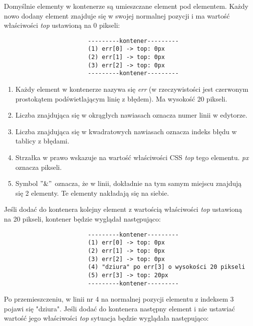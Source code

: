 \documentclass[a4paper,12pt]{book}
\theoremstyle{definition}
\begin{document}
Domyślnie elementy w kontenerze są umieszczane element pod elementem. Każdy nowo dodany element znajduje się w swojej normalnej pozycji i ma wartość właściwości \textit{top} ustawioną na 0 pikseli:

\begin{verbatim}
                        ---------kontener---------
                        (1) err[0] -> top: 0px
                        (2) err[1] -> top: 0px
                        (3) err[2] -> top: 0px
                        ---------kontener---------
\end{verbatim}

\begin{enumerate}
    \item Każdy element w kontenerze nazywa się \textit{err} (w rzeczywistości jest czerwonym prostokątem podświetlającym linię z błędem). Ma wysokość 20 pikseli. 
    \item Liczba znajdująca się w okrągłych nawiasach oznacza numer linii w edytorze.
    \item Liczba znajdująca się w kwadratowych nawiasach oznacza indeks błędu w tablicy z błędami.
    \item Strzałka w prawo wskazuje na wartość właściwości CSS \textit{top} tego elementu. \textit{px} oznacza pikseli.
    \item Symbol $"\&"$ oznacza, że w linii, dokładnie na tym samym miejscu znajdują się 2 elementy. Te elementy nakładają się na siebie.
\end{enumerate}


\noindent Jeśli dodać do kontenera kolejny element z wartością właściwości \textit{top} ustawioną na 20 pikseli, kontener będzie wyglądał następująco:

\begin{verbatim}
                        ---------kontener---------
                        (1) err[0] -> top: 0px
                        (2) err[1] -> top: 0px
                        (3) err[2] -> top: 0px
                        (4) "dziura" po err[3] o wysokości 20 pikseli
                        (5) err[3] -> top: 20px
                        ---------kontener---------
\end{verbatim}

\noindent Po przemieszczeniu, w linii nr 4 na normalnej pozycji elementu z indeksem 3 pojawi się "dziura". Jeśli dodać do kontenera następny element i nie ustawiać wartość jego właściwości \textit{top} sytuacja będzie wyglądała następująco:

\newpage
\end{document}
